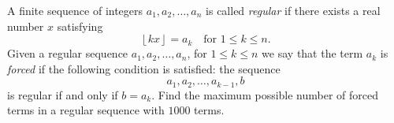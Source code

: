 A finite sequence of integers $a_1, a_2, \dots, a_n$ is called \emph{regular} if there exists a real number $x$ satisfying \[ \left\lfloor kx \right\rfloor = a_k \quad \text{for } 1 \le k \le n. \] Given a regular sequence $a_1, a_2, \dots, a_n$, for $1 \le k \le n$ we say that the term $a_k$ is \emph{forced} if the following condition is satisfied: the sequence \[ a_1, a_2, \dots, a_{k-1}, b \] is regular if and only if $b = a_k$.  Find the maximum possible number of forced terms in a regular sequence with $1000$ terms.